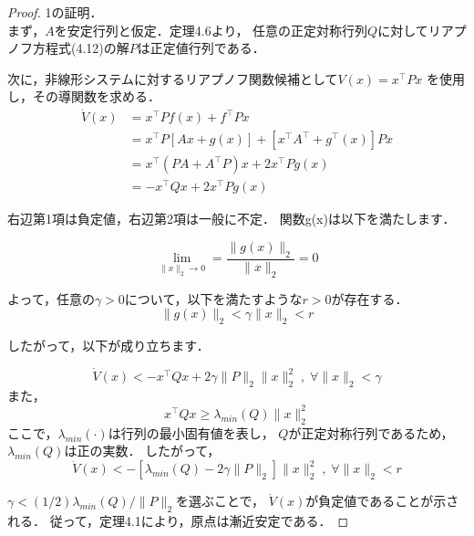 \documentclass{jsarticle}
\begin{document}
\begin{proof}
  1の証明．\\  
  まず，$A$を安定行列と仮定．定理4.6より，
  任意の正定対称行列$Q$に対してリアプノフ方程式(4.12)の解$P$は正定値行列である．
  
  次に，非線形システムに対するリアプノフ関数候補として$V(x) = x^\top Px$
  を使用し，その導関数を求める．
  \begin{align*}
    \dot{V}(x) &= x^\top Pf(x) + f^\top Px\\
    &=x^\top P[Ax +g(x)]+[x^\top A^\top +g^\top (x)]Px\\
    &=x^\top (PA+A^\top P)x + 2x^\top P g(x)\\
    &= -x^\top Qx +2x^\top Pg(x)
  \end{align*}
  
  右辺第1項は負定値，右辺第2項は一般に不定．
  関数g(x)は以下を満たします．
  
  \begin{equation*}
    \lim_{\|x\|_2\rightarrow 0} = \frac{\|g(x)\|_2}{\|x\|_2}=0
  \end{equation*}

  よって，任意の$\gamma >0$について，以下を満たすような$r>0$が存在する．
  \begin{equation*}
    \|g(x)\|_2<\gamma \|x\|_2<r
  \end{equation*}

  したがって，以下が成り立ちます．

  \begin{equation*}
    \dot V(x) < -x^\top Qx + 2 \gamma\|P\|_2\|x\|^2_2\;,\;\forall \|x\|_2<\gamma
  \end{equation*}
また，
\begin{equation*}
  x^\top Q x \geq \lambda_{min}(Q)\|x\|^2_2
\end{equation*}
ここで，$\lambda_{min}(\cdot)$は行列の最小固有値を表し，
$Q$が正定対称行列であるため，$\lambda_{min}(Q)$は正の実数．
したがって，
\begin{equation*}
  \dot V(x) < -[\lambda_{min}(Q)-2\gamma\|P\|_2]\|x\|^2_2\;,\;\forall \|x\|_2<r
\end{equation*}

$\gamma < (1/2)\lambda_{min}(Q)/\|P\|_2$を選ぶことで，
$\dot V(x)$が負定値であることが示される．
従って，定理4.1により，原点は漸近安定である．


\end{proof}
\end{document}
